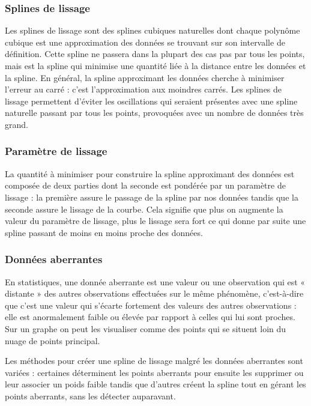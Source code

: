 \documentclass[a4paper,10pt]{article} %
\begin{document}
\subsubsection*{Splines de lissage}
Les splines de lissage sont des splines cubiques naturelles dont chaque polynôme cubique est une approximation des données se trouvant sur son intervalle de définition. Cette spline ne passera dans la plupart des cas pas par tous les points, mais est la spline qui minimise une quantité liée à la distance entre les données et la spline. En général, la spline approximant les données cherche à minimiser l'erreur au carré : c'est l'approximation aux moindres carrés. 
Les splines de lissage permettent d'éviter les oscillations qui seraient présentes avec une spline naturelle passant par tous les points, provoquées avec un nombre de données très grand.

\subsubsection*{Paramètre de lissage}
La quantité à minimiser pour construire la spline approximant des données est composée de deux parties dont la seconde est pondérée par un paramètre de lissage : la première assure le passage de la spline par nos données tandis que la seconde assure le lissage de la courbe. Cela signifie que plus on augmente la valeur du paramètre de lissage, plus le lissage sera fort ce qui donne par suite une spline passant de moins en moins proche des données.

\subsubsection*{Données aberrantes}

En statistiques, une donnée aberrante est une valeur ou une observation qui est « distante » des autres observations effectuées sur le même phénomène, c'est-à-dire que c’est une valeur qui s'écarte fortement des valeurs des autres observations : elle est anormalement faible ou élevée par rapport à celles qui lui sont proches. Sur un graphe on peut les visualiser comme des points qui se situent loin du nuage de points principal.

Les  méthodes pour créer une spline de lissage malgré les données aberrantes sont variées : certaines déterminent les points aberrants pour ensuite les supprimer ou leur associer un poids faible tandis que d'autres créent la spline tout en gérant les points aberrants, sans les détecter auparavant. 
\end{document}
